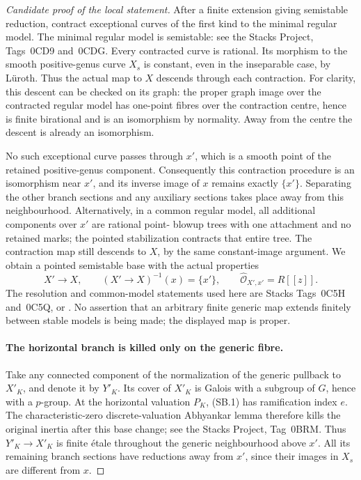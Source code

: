 \begin{proof}[Candidate proof of the local statement]
After a finite extension giving semistable reduction,
contract exceptional curves of the first kind to the
minimal regular model. The minimal regular model is
semistable: see the Stacks Project, Tags~0CD9 and~0CDG.
Every contracted curve is rational. Its morphism to the
smooth positive-genus curve \(X_s\) is constant, even
in the inseparable case, by L\"uroth. Thus the actual map
to \(X\) descends through each contraction. For clarity,
this descent can be checked on its graph: the proper graph
image over the contracted regular model has one-point
fibres over the contraction centre, hence is finite
birational and is an isomorphism by normality. Away from
the centre the descent is already an isomorphism.

No such exceptional curve passes through \(x'\), which
is a smooth point of the retained positive-genus component.
Consequently this contraction procedure is an isomorphism
near \(x'\), and its inverse image of \(x\) remains
exactly \(\{x'\}\). Separating the other branch sections
and any auxiliary sections takes place away from this
neighbourhood. Alternatively, in a common regular model,
all additional components over \(x'\) are rational point-
blowup trees with one attachment and no retained marks;
the pointed stabilization contracts that entire tree.
The contraction map still descends to \(X\), by the same
constant-image argument. We obtain a pointed semistable
base with the actual properties
\[
 X'\longrightarrow X,\qquad (X'\longrightarrow X)^{-1}(x)
       =\{x'\},\qquad
 \widehat{\mathcal O}_{X',x'}=R[[z]].                    \tag{SB.2a}
\]
The resolution and common-model statements used here are
Stacks Tags~0C5H and~0C5Q, or
\cite[\S9.2 and \S10.3]{fghLiu}. No assertion that
an arbitrary finite generic map extends finitely between
stable models is being made; the displayed map is proper.

\paragraph{The horizontal branch is killed only on the generic fibre.}
Take any connected component of the normalization of the
generic pullback to \(X'_K\), and denote it by \(Y'_K\).
Its cover of \(X'_K\) is Galois with a subgroup of \(G\),
hence with a \(p\)-group. At the horizontal valuation
\(P_K\), (SB.1) has ramification index \(e\).
The characteristic-zero discrete-valuation Abhyankar lemma
therefore kills the original inertia after this base change;
see the Stacks Project, Tag~0BRM. Thus \(Y'_K\to X'_K\)
is finite \'etale throughout the generic neighbourhood
above \(x'\). All its remaining branch sections have
reductions away from \(x'\), since their images in \(X_s\)
are different from \(x\).


\end{proof}

